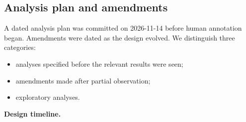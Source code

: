 \documentclass[11pt]{article}
\providecommand{\tightlist}{\setlength{\itemsep}{0pt}\setlength{\parskip}{0pt}}
\begin{document}
\hypertarget{sec-3-8}{%
\subsection{Analysis plan and amendments}\label{sec-3-8}}

A dated analysis plan was committed on 2026-11-14 before human annotation began. Amendments were dated as the design evolved. We distinguish three categories:

\begin{itemize}
\tightlist
\item
  analyses specified before the relevant results were seen;
\item
  amendments made after partial observation;
\item
  exploratory analyses.
\end{itemize}

\textbf{Design timeline.}
\end{document}
